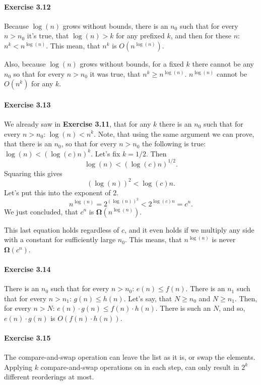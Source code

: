 \documentclass[a4paper,12pt]{article}
\newcommand{\exercise}[1]{\paragraph{Exercise #1}}
\begin{document}
    \exercise{3.12} Because $\log(n)$ grows without bounds, there is an $n_0$ such that for every $n > n_0$ it's true, that $\log(n) > k$ for any prefixed $k$, and then for these $n$: $n^k < n^{\log(n)}$. This mean, that $n^k$ is $O(n^{\log(n)})$.

    Also, because $\log(n)$ grows without bounds, for a fixed $k$ there cannot be any $n_0$ so that for every $n > n_0$ it was true, that $n^k \geq n^{\log(n)}$. $n^{\log(n)}$ cannot be $O(n^k)$ for any $k$.

    \exercise{3.13} We already saw in \textbf{Exercise 3.11}, that for any $k$ there is an $n_0$ such that for every $n > n_0$: $\log(n) < n^k$. Note, that using the same argument we can prove, that there is an $n_0$, so that for every $n > n_0$ the following is true: $\log(n) < (\log(c) n)^k$. Let's fix $k = 1/2$. Then
    \begin{equation}
        \log(n) < (\log(c) n)^{1/2} \textrm{.}
    \end{equation}
    Squaring this gives
    \begin{equation}
        (\log(n))^2 < \log(c) n \textrm{.}
    \end{equation}
    Let's put this into the exponent of 2.
    \begin{equation}
        n^{\log(n)} = 2^{(\log(n))^2} < 2^{\log(c) n} = c^n \textrm{.}
    \end{equation}
    We just concluded, that $c^n$ is $\boldsymbol{\Omega}(n^{\log(n)})$.

    This last equation holds regardless of $c$, and it even holds if we multiply any side with a constant for sufficiently large $n_0$. This means, that $n^{\log(n)}$ is never $\boldsymbol{\Omega}(c^n)$.

    \exercise{3.14} There is an $n_0$ such that for every $n > n_0$: $e(n) \leq f(n)$. There is an $n_1$ such that for every $n > n_1$: $g(n) \leq h(n)$. Let's say, that $N \geq n_0$ and $N \geq n_1$. Then, for every $n > N$: $e(n) \cdot g(n) \leq f(n) \cdot h(n)$. There is such an $N$, and so, $e(n) \cdot g(n)$ is $O(f(n) \cdot h(n))$.

    \exercise{3.15} \cite{knuth1997art} The compare-and-swap operation can leave the list as it is, or swap the elements. Applying $k$ compare-and-swap operations on in each step, can only result in $2^k$ different reorderings at most.
\end{document}
